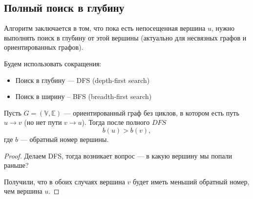 \documentclass[russian]{lecture-notes}
\newenvironment{centeredgraph}[3]
{
	\begin{center}
		\begin{tikzpicture}[every node/.style={#1}, every edge/.style={#2}, every path/.style={#3}]
	}
	{
		\end{tikzpicture}
	\end{center}
}
\begin{document}
	\subsection{Полный поиск в глубину}
	Алгоритм заключается в том, что пока есть непосещенная вершина $u$, нужно выполнять поиск в глубину от этой вершины (актуально для несвязных графов и ориентированных графов).
	\begin{note}
		Будем использовать сокращения:
		\begin{itemize}
			\item Поиск в глубину --- DFS (depth-first search)
			\item Поиск в ширину -- BFS (breadth-first search)
		\end{itemize}
	\end{note}
	
	\begin{proposition}
		Пусть $G = (\mathbb{V}, \mathbb{E})$ --- ориентированный граф без циклов, в котором есть путь $u \to v$ (но нет пути $v \to u$). Тогда после полного $DFS$
		$$b(u) > b(v),$$
		где $b$ --- обратный номер вершины.
	\end{proposition}
	
	\begin{proof}
		Делаем DFS, тогда возникает вопрос --- в какую вершину мы попали раньше?
		Получили, что в обоих случаях вершина $v$ будет иметь меньший обратный номер, чем вершина $u$.
	\end{proof}
	
\end{document}
